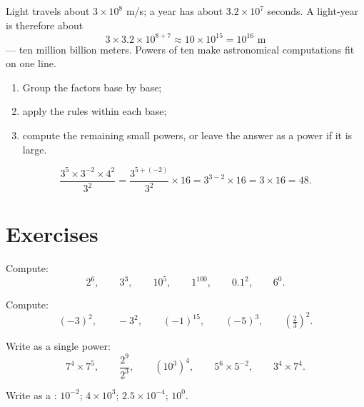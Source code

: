 \begin{example}\label{ex:g8:powers:magnitude}
Light travels about $3 \times 10^8$ m/s; a year has about
$3.2 \times 10^7$ seconds. A light-year is therefore about
\[
3 \times 3.2 \times 10^{8+7} \approx 10 \times 10^{15} = 10^{16}
\text{ m}
\]
--- ten million billion meters. Powers of ten make astronomical
computations fit on one line.
\end{example}

\begin{method}\label{met:g8:powers:simplify}
\begin{enumerate}
  \item Group the factors base by base;
  \item apply the  rules within each base;
  \item compute the remaining small powers, or leave the answer as a
        power if it is large.
\end{enumerate}
\end{method}

\begin{example}\label{ex:g8:powers:simplify}
\[
\frac{3^5 \times 3^{-2} \times 4^2}{3^2}
= \frac{3^{5 + (-2)}}{3^2} \times 16
= 3^{3 - 2} \times 16
= 3 \times 16 = 48 .
\]
\end{example}

\section{Exercises}

\begin{exercise}[$\star$]\label{exo:g8:powers:1}
Compute:
\[
2^6, \qquad 3^3, \qquad 10^5, \qquad 1^{100}, \qquad 0.1^2, \qquad
6^0 .
\]
\end{exercise}

\begin{exercise}[$\star$]\label{exo:g8:powers:2}
Compute:
\[
(-3)^2, \qquad -3^2, \qquad (-1)^{15}, \qquad (-5)^3, \qquad
\left(\tfrac{2}{3}\right)^2 .
\]
\end{exercise}

\begin{exercise}[$\star$]\label{exo:g8:powers:3}
Write as a single power:
\[
7^4 \times 7^5, \qquad
\frac{2^9}{2^3}, \qquad
\left(10^3\right)^4, \qquad
5^6 \times 5^{-2}, \qquad
3^4 \times 7^4 .
\]
\end{exercise}

\begin{exercise}[$\star$]\label{exo:g8:powers:4}
Write as a : $10^{-2}$; \quad $4 \times 10^3$; \quad
$2.5 \times 10^{-4}$; \quad $10^0$.
\end{exercise}

